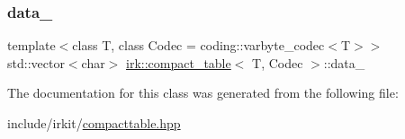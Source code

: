 \subsubsection{\texorpdfstring{data\+\_\+}{data\_}}
{\footnotesize\ttfamily template$<$class T, class Codec = coding\+::varbyte\+\_\+codec$<$\+T$>$$>$ \\
std\+::vector$<$char$>$ \mbox{\hyperlink{classirk_1_1compact__table}{irk\+::compact\+\_\+table}}$<$ T, Codec $>$\+::data\+\_\+\hspace{0.3cm}{\ttfamily [protected]}}



The documentation for this class was generated from the following file\+:\begin{DoxyCompactItemize}
\item 
include/irkit/\mbox{\hyperlink{compacttable_8hpp}{compacttable.\+hpp}}\end{DoxyCompactItemize}
